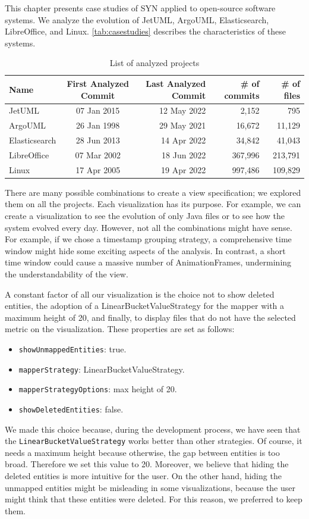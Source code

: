 This chapter presents case studies of SYN applied to open-source software systems. 
We analyze the evolution of JetUML, ArgoUML, Elasticsearch, LibreOffice, and Linux. 
\autoref{tab:casestudies} describes the characteristics of these systems.

\begin{table}[ht]
    \centering
    \begin{tabular}{lcrrr} 
        \hline
        {\bf Name} & {\bf First Analyzed Commit} & {\bf Last Analyzed Commit} & {\bf \# of commits} & {\bf \# of files}\\ 
        \hline
        JetUML & 07 Jan 2015 & 12 May 2022 & 2,152 & 795\\ 
        ArgoUML & 26 Jan 1998 & 29 May 2021 & 16,672 & 11,129 \\
        Elasticsearch & 28 Jun 2013 & 14 Apr 2022 & 34,842 & 41,043 \\
        LibreOffice & 07 Mar 2002 & 18 Jun 2022 & 367,996 & 213,791 \\
        Linux & 17 Apr 2005 & 19 Apr 2022 & 997,486 & 109,829
    \end{tabular}
    \caption{List of analyzed projects}
    \label{tab:casestudies}
\end{table}


There are many possible combinations to create a view specification; we explored them on all the projects. 
Each visualization has its purpose. For example, we can create a visualization to see the evolution of only Java files or to see how the system evolved every day. 
However, not all the combinations might have sense. For example, if we chose a timestamp grouping strategy, a comprehensive time window might hide some exciting aspects of the analysis. In contrast, a short time window could cause a massive number of AnimationFrames, undermining the understandability of the view. 

A constant factor of all our visualization is the choice not to show deleted entities, the adoption of a LinearBucketValueStrategy for the mapper with a maximum height of 20, and finally, to display files that do not have the selected metric on the visualization. 
These properties are set as follows:
\begin{itemize}
    \item \texttt{showUnmappedEntities}: true.
    \item \texttt{mapperStrategy}: LinearBucketValueStrategy.
    \item \texttt{mapperStrategyOptions}: max height of 20.
    \item \texttt{showDeletedEntities}: false.
\end{itemize}
We made this choice because, during the development process, we have seen that the \texttt{LinearBucketValueStrategy} works better than other strategies. Of course, it needs a maximum height because otherwise, the gap between entities is too broad. Therefore we set this value to 20. Moreover, we believe that hiding the deleted entities is more intuitive for the user. On the other hand, hiding the unmapped entities might be misleading in some visualizations, because the user might think that these entities were deleted. For this reason, we preferred to keep them. 


